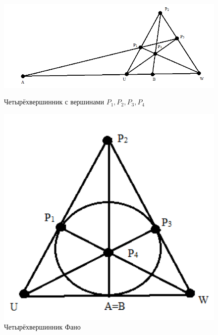 \begin{figure}[H]
  \begin{center}
    \begin{minipage}[h]{0.68\linewidth}
        \includegraphics[width=1\textwidth]{authors/Stepanuk-1-fig-1.png}
        \caption{Четырёхвершинник с вершинами $P_1, P_2, P_3, P_4$}
        \label{fig:Stepanuk-1-fig-1}
    \end{minipage}
\hfill
    \begin{minipage}[h]{0.28\linewidth}
        \includegraphics[width=1\textwidth]{authors/Stepanuk-1-fig-2.png}
        \caption{Четырёхвершинник Фано}
        \label{fig:Stepanuk-1-fig-2}
    \end{minipage}


  \end{center}

\end{figure}
